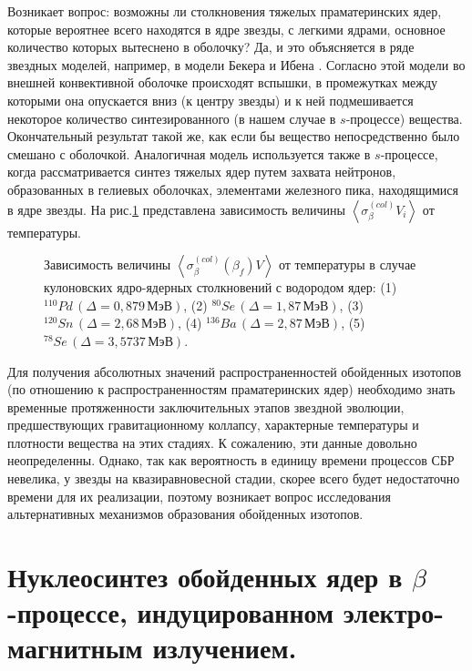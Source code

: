Возникает вопрос: возможны ли столкновения тяжелых праматеринских ядер, которые
вероятнее всего находятся в ядре звезды, с легкими ядрами, основное количество
которых вытеснено в оболочку? Да, и это объясняется в ряде звездных моделей,
например, в модели Бекера и Ибена \cite{becker}. Согласно этой модели  во внешней
конвективной оболочке происходят вспышки, в промежутках между которыми она опускается
вниз (к центру звезды) и к ней подмешивается некоторое количество синтезированного (в нашем случае
в $s$-процессе) вещества. Окончательный результат такой же, как если бы
вещество непосредственно было смешано с оболочкой. Аналогичная модель используется
также в $s$-процессе, когда рассматривается синтез тяжелых ядер путем захвата
нейтронов, образованных в гелиевых оболочках, элементами железного пика,
находящимися в ядре звезды.
На рис.\ref{SVT}  представлена зависимость величины $\left\langle\sigma_\beta^{(col)} V_i\right\rangle$
от температуры.

\begin{figure}
\vspace{18 true cm}
\caption{{
Зависимость величины $\left\langle\sigma_\beta^{(col)}(\beta_f) V\right\rangle$
от температуры в случае кулоновских ядро-ядерных столкновений с водородом ядер:
(1) $^{110}Pd\,(\Delta=0,879\, МэВ)$, (2) $^{80}Se\,(\Delta=1,87\, МэВ)$, (3) $^{120}Sn\,(\Delta=2,68\, МэВ)$,
(4) $^{136}Ba\,(\Delta=2,87\, МэВ)$, (5) $^{78}Se\,(\Delta=3,5737\, МэВ)$.}}
\label{SVT}
\end{figure}

Для получения абсолютных значений распространенностей обойденных изотопов
(по отношению к распространенностям праматеринских ядер)
необходимо знать временные протяженности заключительных этапов звездной
эволюции, предшествующих гравитационному коллапсу, характерные
температуры и плотности вещества на этих стадиях. К сожалению, эти данные довольно неопределенны.
Однако, так как вероятность в единицу времени процессов
СБР невелика, у звезды на квазиравновесной стадии, скорее всего будет
недостаточно времени для их реализации, поэтому возникает вопрос исследования
альтернативных механизмов образования обойденных изотопов.






\section{Нуклеосинтез обойденных ядер в $\beta$-процессе, индуцированном
электро- \\ магнитным излучением.}

